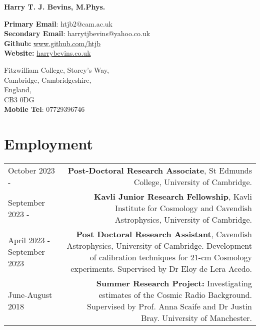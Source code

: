 \documentclass{article}
\begin{document}
\small

\begin{center}
\huge
\textbf{Harry T. J. Bevins, M.Phys.}
\end{center}

\begin{minipage}[ht]{0.6\linewidth}
	\textbf{Primary Email}: htjb2@cam.ac.uk \\
	\textbf{Secondary Email}: harrytjbevins@yahoo.co.uk \\
	\textbf{Github:} \url{www.github.com/htjb}\\
	\textbf{Website:} \url{harrybevins.co.uk}
\end{minipage}
\begin{minipage}[ht]{0.3\linewidth}
	\begin{flushright}
	Fitzwilliam College, Storey's Way,\\
	Cambridge, Cambridgeshire,\\
	England,\\
	CB3 0DG \\
    \textbf{Mobile Tel}: 07729396746 \\
	\end{flushright}
\end{minipage}

\section*{Employment}
\begin{tabular}{L!{\vrule}R}
    October 2023 - & \textbf{Post-Doctoral Research Associate}, St Edmunds College, University of Cambridge. \\
    September 2023 - & \textbf{Kavli Junior Research Fellowship}, Kavli Institute for Cosmology and Cavendish Astrophysics, University of Cambridge. \\
    April 2023 - September 2023 & \textbf{Post Doctoral Research Assistant}, Cavendish Astrophysics, University of Cambridge. Development of calibration techniques for 21-cm Cosmology experiments. Supervised by Dr Eloy de Lera Acedo.\\
    June-August 2018 & \textbf{Summer Research Project:} Investigating estimates of the Cosmic Radio Background. Supervised by Prof. Anna Scaife and Dr Justin Bray. University of Manchester. \\
\end{tabular}
\end{document}
